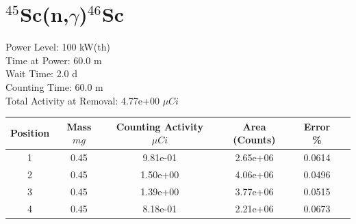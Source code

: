 \newpage

\section*{ $^{45}$Sc(n,$\gamma$)$^{46}$Sc }

Power Level: 100 kW(th) \\
Time at Power: 60.0 m \\
Wait Time:  2.0 d \\
Counting Time: 60.0 m \\
Total Activity at Removal: 4.77e+00 $\mu Ci$

\begin{table}[h]
\centering
\begin{tabular}{ |c|c|c|c|c|c| }
 \hline
 Position & Mass $mg$ & Counting Activity $\mu Ci$ & Area (Counts) & Error \% \\
 \hline 
 1 & 0.45 & 9.81e-01 & 2.65e+06 & 0.0614 \\ 
\hline
 2 & 0.45 & 1.50e+00 & 4.06e+06 & 0.0496 \\ 
\hline
 3 & 0.45 & 1.39e+00 & 3.77e+06 & 0.0515 \\ 
\hline
 4 & 0.45 & 8.18e-01 & 2.21e+06 & 0.0673 \\ 
\hline
\end{tabular}
\end{table}

